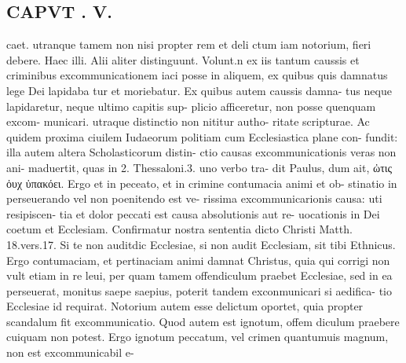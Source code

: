 \documentclass{article}
\begin{document}
\begin{pages}
\section*{CAPVT . V. }caet. utranque tamem non nisi propter rem et deli ctum iam notorium, fieri debere. Haec illi. Alii aliter distinguunt. Volunt.n ex iis tantum caussis et criminibus excommunicationem iaci posse in aliquem, ex quibus quis damnatus lege Dei lapidaba tur et moriebatur. Ex quibus autem caussis damna- tus neque lapidaretur, neque ultimo capitis sup- plicio afficeretur, non posse quenquam excom- municari. utraque distinctio non nititur autho- ritate scripturae. Ac quidem proxima ciuilem Iudaeorum politiam cum Ecclesiastica plane con- fundit: illa autem altera Scholasticorum distin- ctio causas excommunicationis veras non ani- maduertit, quas in 2. Thessaloni.3. uno verbo tra- dit Paulus, dum ait, ὠτις ὀυχ ὐπακόει. Ergo et in peceato, et in crimine contumacia animi et ob- stinatio in perseuerando vel non poenitendo est ve- rissima excommunicarionis causa: uti resipiscen- tia et dolor peccati est causa absolutionis aut re- uocationis in Dei coetum et Ecclesiam. Confirmatur nostra sententia dicto Christi Matth. 18.vers.17. Si te non auditdic Ecclesiae, si non audit Ecclesiam, sit tibi Ethnicus. Ergo contumaciam, et pertinaciam animi damnat Christus, quia qui corrigi non vult etiam in re leui, per quam tamem offendiculum praebet Ecclesiae, sed in ea perseuerat, monitus saepe saepius, poterit tandem exconmunicari si aedifica- tio Ecclesiae id requirat. Notorium autem esse delictum oportet, quia propter scandalum fit excommunicatio. Quod autem est ignotum, offem diculum praebere cuiquam non potest. Ergo ignotum peccatum, vel crimen quantumuis magnum, non est excommunicabil e- 

\end{pages}
\end{document}
